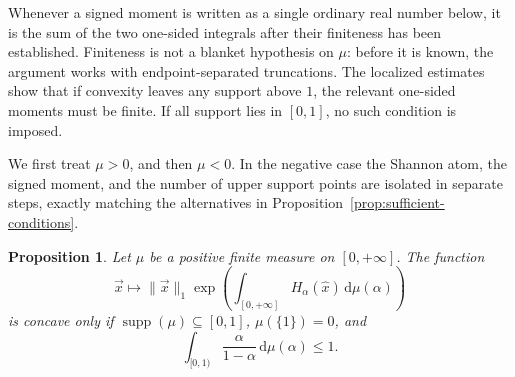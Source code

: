 \documentclass[aps,pra,11pt,onecolumn,nofootinbib,tightenlines]{revtex4-2}
\newtheorem{proposition}[theorem]{Proposition}
\theoremstyle{definition}
\def\d{\mathrm{d}}
\begin{document}
Whenever a signed moment is written as a single ordinary real number below, it is
the sum of the two one-sided integrals after their finiteness has been established.
Finiteness is not a blanket hypothesis on $\mu$: before it is known, the argument
works with endpoint-separated truncations.  The localized estimates show that if
convexity leaves any support above $1$, the relevant one-sided moments must be
finite.  If all support lies in $[0,1]$, no such condition is imposed.

We first treat $\mu>0$, and then $\mu<0$.  In the negative case the Shannon atom,
the signed moment, and the number of upper support points are isolated in separate
steps, exactly matching the alternatives in
Proposition~\ref{prop:sufficient-conditions}.

\begin{proposition}
\label{prop:first-measure}
Let $\mu$ be a positive finite measure on $[0,+\infty]$.  The function
\begin{equation}
\vec{x}\longmapsto\|\vec{x}\|_1
\exp\!\left(\int_{[0,+\infty]}H_\alpha(\hat{x})\,
\d\mu(\alpha)\right)
\end{equation}
is concave only if
$\operatorname{supp}(\mu)\subseteq[0,1]$, $\mu(\{1\})=0$, and
\begin{equation}
\int_{[0,1)}\frac{\alpha}{1-\alpha}\,\d\mu(\alpha)\leq1.
\end{equation}
\end{proposition}
\end{document}
